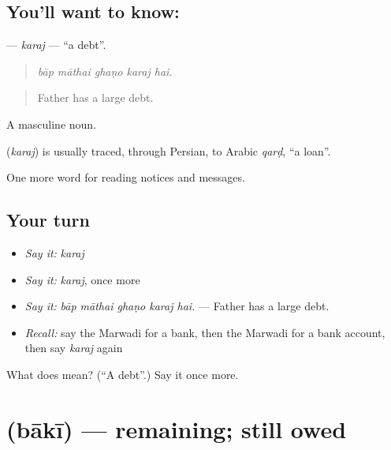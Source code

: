\subsection*{You'll want to know: }
\textbf{} — \emph{karaj} — \textquotedblleft{}a debt\textquotedblright{}.

\begin{quote}
    
\end{quote}

\begin{quote}
\emph{bāp māthai ghaṇo karaj hai.}
\end{quote}

\begin{quote}
Father has a large debt.
\end{quote}

A masculine noun.

\begin{cousinweb}
\textbf{} (\emph{karaj}) is usually traced, through Persian, to Arabic \emph{qarḍ}, \textquotedblleft{}a loan\textquotedblright{}.
\end{cousinweb}

\begin{grammarlens}[title={What you've built}]
One more word for reading notices and messages.
\end{grammarlens}

\subsection*{Your turn}
\begin{itemize}
\raggedright
  \item \emph{Say it:} \emph{karaj}
  \item \emph{Say it:} \emph{karaj}, once more
  \item \emph{Say it:} \emph{bāp māthai ghaṇo karaj hai.} — Father has a large debt.
  \item \emph{Recall:} say the Marwadi for a bank, then the Marwadi for a bank account, then say \emph{karaj} again
\end{itemize}

\begin{tcolorbox}[breakable,colback=teal!4,colframe=teal!35!black,title={Before you move on}]
What does  mean? (\textquotedblleft{}A debt\textquotedblright{}.) Say it once more.
\end{tcolorbox}
\section[\texorpdfstring{\mw{बाकी} (bākī)}{बाकी (bākī)}]{ (bākī) — remaining; still owed}

